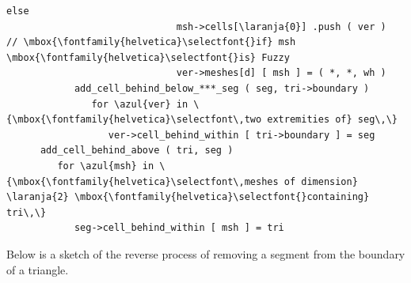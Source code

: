 \begin{Verbatim}[commandchars=\\\{\},formatcom=\small\tt,baselinestretch=0.94]
                           else
                              msh->cells[\laranja{0}] .push ( ver )  // \mbox{\fontfamily{helvetica}\selectfont{}if} msh \mbox{\fontfamily{helvetica}\selectfont{}is} Fuzzy
                              ver->meshes[d] [ msh ] = ( *, *, wh )
            add_cell_behind_below_***_seg ( seg, tri->boundary )
               for \azul{ver} in \{\mbox{\fontfamily{helvetica}\selectfont\,two extremities of} seg\,\}
                  ver->cell_behind_within [ tri->boundary ] = seg
      add_cell_behind_above ( tri, seg )
         for \azul{msh} in \{\mbox{\fontfamily{helvetica}\selectfont\,meshes of dimension} \laranja{2} \mbox{\fontfamily{helvetica}\selectfont{}containing} tri\,\}
            seg->cell_behind_within [ msh ] = tri
\end{Verbatim}

Below is a sketch of the reverse process of removing a segment from the boundary of a triangle.

